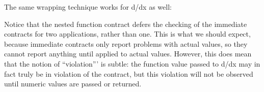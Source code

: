 The same wrapping technique works for d/dx as well:



Notice that the nested function contract defers the checking of the immediate
contracts for two applications, rather than one. This is what we should expect,
because immediate contracts only report problems with actual values, so they
cannot report anything until applied to actual values. However, this does mean
that the notion of “violation”’ is subtle: the function value passed to d/dx may
in fact truly be in violation of the contract, but this violation will not be
observed until numeric values are passed or returned.
